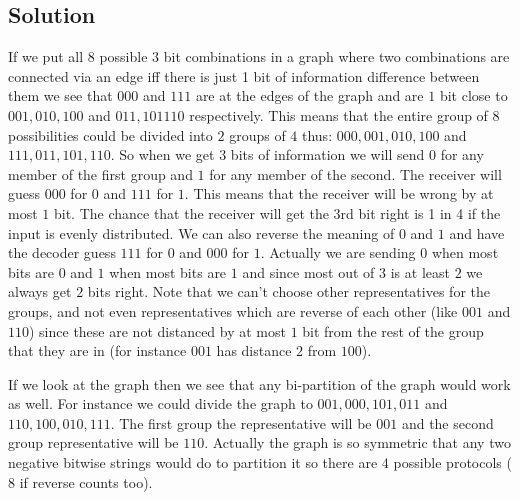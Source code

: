 \documentclass{article}
\begin{document}
\subsection{Solution}
If we put all $8$ possible $3$ bit combinations in a graph where two combinations are connected via an edge iff there is just 1 bit of information difference between them we see that $000$ and $111$ are at the edges of the graph and are $1$ bit close to $001, 010, 100$ and $011, 101 110$ respectively. This means that the entire group of $8$ possibilities could be divided into $2$ groups of $4$ thus: $000, 001, 010, 100$ and $111, 011, 101, 110$. So when we get $3$ bits of information we will send $0$ for any member of the first group and $1$ for any member of the second. The receiver will guess $000$ for $0$ and $111$ for $1$. This means that the receiver will be wrong by at most $1$ bit. The chance that the receiver will get the 3rd bit right is 1 in 4 if the input is evenly distributed. We can also reverse the meaning of $0$ and $1$ and have the decoder guess $111$ for $0$ and $000$ for $1$. Actually we are sending $0$ when most bits are $0$ and $1$ when most bits are $1$ and since most out of $3$ is at least $2$ we always get $2$ bits right. Note that we can't choose other representatives for the groups, and not even representatives which are reverse of each other (like $001$ and $110$) since these are not distanced by at most $1$ bit from the rest of the group that they are in (for instance $001$ has distance $2$ from $100$).

\begin{center}
\end{center}

If we look at the graph then we see that any bi-partition of the graph would work as well. For instance we could divide the graph to $001, 000, 101, 011$ and $110, 100, 010, 111$. The first group the representative will be $001$ and the second group representative will be $110$. Actually the graph is so symmetric that any two negative bitwise strings would do to partition it so there are $4$ possible protocols ($8$ if reverse counts too).
\end{document}
